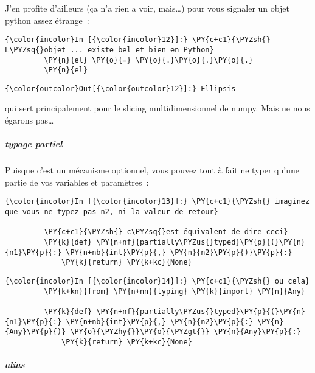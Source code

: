     J'en profite d'ailleurs (ça n'a rien a voir, mais\ldots{}) pour vous
signaler un objet python assez étrange~:

    \begin{Verbatim}[commandchars=\\\{\}]
{\color{incolor}In [{\color{incolor}12}]:} \PY{c+c1}{\PYZsh{} L\PYZsq{}objet ... existe bel et bien en Python}
         \PY{n}{el} \PY{o}{=} \PY{o}{.}\PY{o}{.}\PY{o}{.}
         \PY{n}{el}
\end{Verbatim}


\begin{Verbatim}[commandchars=\\\{\}]
{\color{outcolor}Out[{\color{outcolor}12}]:} Ellipsis
\end{Verbatim}
            
    qui sert principalement pour le slicing multidimensionnel de numpy. Mais
ne nous égarons pas\ldots{}

    \hypertarget{typage-partiel}{%
\subparagraph{typage partiel}\label{typage-partiel}}

    Puisque c'est un mécanisme optionnel, vous pouvez tout à fait ne typer
qu'une partie de vos variables et paramètres~:

    \begin{Verbatim}[commandchars=\\\{\}]
{\color{incolor}In [{\color{incolor}13}]:} \PY{c+c1}{\PYZsh{} imaginez que vous ne typez pas n2, ni la valeur de retour}
         
         \PY{c+c1}{\PYZsh{} c\PYZsq{}est équivalent de dire ceci}
         \PY{k}{def} \PY{n+nf}{partially\PYZus{}typed}\PY{p}{(}\PY{n}{n1}\PY{p}{:} \PY{n+nb}{int}\PY{p}{,} \PY{n}{n2}\PY{p}{)}\PY{p}{:}
             \PY{k}{return} \PY{k+kc}{None}
\end{Verbatim}


    \begin{Verbatim}[commandchars=\\\{\}]
{\color{incolor}In [{\color{incolor}14}]:} \PY{c+c1}{\PYZsh{} ou cela}
         \PY{k+kn}{from} \PY{n+nn}{typing} \PY{k}{import} \PY{n}{Any}
         
         \PY{k}{def} \PY{n+nf}{partially\PYZus{}typed}\PY{p}{(}\PY{n}{n1}\PY{p}{:} \PY{n+nb}{int}\PY{p}{,} \PY{n}{n2}\PY{p}{:} \PY{n}{Any}\PY{p}{)} \PY{o}{\PYZhy{}}\PY{o}{\PYZgt{}} \PY{n}{Any}\PY{p}{:}
             \PY{k}{return} \PY{k+kc}{None}
\end{Verbatim}


    \hypertarget{alias}{%
\subparagraph{alias}\label{alias}}

